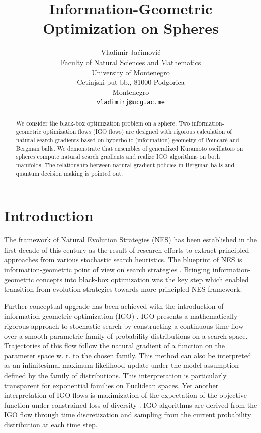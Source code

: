 \documentclass{article}
\title{Information-Geometric Optimization on Spheres}
\author{Vladimir Ja\' cimovi\' c \\
	Faculty of Natural Sciences and Mathematics\\
	University of Montenegro\\
	Cetinjski put bb., 81000 Podgorica\\
	Montenegro\\
	\texttt{vladimirj@ucg.ac.me} \\
}
\theoremstyle{plain}%
\theoremstyle{definition}
\theoremstyle{remark}
\theoremstyle{prop}
\begin{document}
\maketitle

\begin{abstract}
We consider the black-box optimization problem on a sphere. Two information-geometric optimization flows (IGO flows) are designed with rigorous calculation of natural search gradients based on hyperbolic (information) geometry of Poincar\' e and Bergman balls. We demonstrate that ensembles of generalized Kuramoto oscillators on spheres compute natural search gradients and realize IGO algorithms on both manifolds. The relationship between natural gradient policies in Bergman balls and quantum decision making is pointed out.
\end{abstract}




\section{Introduction}

The framework of Natural Evolution Strategies (NES) \cite{Wierstra} has been established in the first decade of this century as the result of research efforts to extract principled approaches from various stochastic search heuristics. The blueprint of NES is information-geometric point of view on search strategies \cite{Beyer,OAAH}. Bringing information-geometric concepts into black-box optimization was the key step which enabled transition from evolution strategies \cite{BS} towards more principled NES framework. 

Further conceptual upgrade has been achieved with the introduction of information-geometric optimization (IGO) \cite{OAAH}. IGO presents a mathematically rigorous approach to stochastic search by constructing a continuous-time flow over a smooth parametric family of probability distributions on a search space. Trajectories of this flow follow the natural gradient of a function on the parameter space w. r. to the chosen family. This method can also be interpreted as an infinitesimal maximum likelihood update under the model assumption defined by the family of distributions. This interpretation is particularly transparent for exponential families on Euclidean spaces. Yet another interpretation of IGO flows is maximization of the expectation of the objective function under constrained loss of diversity \cite{Beyer,OAAH}. IGO algorithms are derived from the IGO flow through time discretization and sampling from the current probability distribution at each time step.
\end{document}
